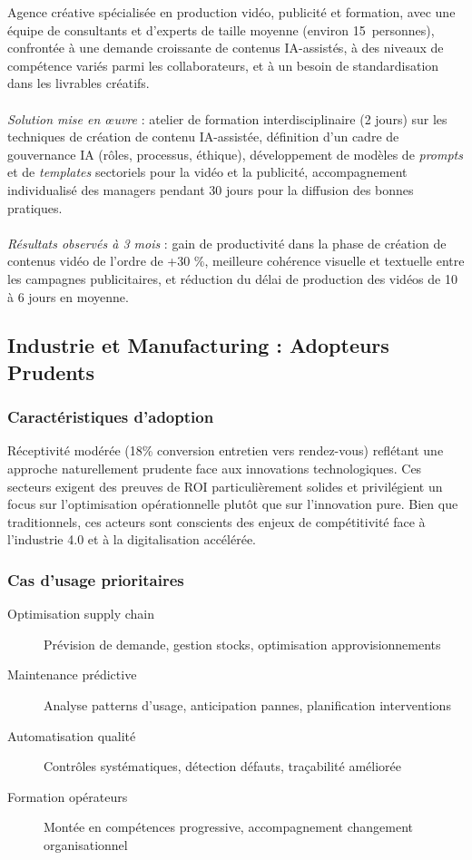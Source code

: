 Agence créative spécialisée en production vidéo, publicité et formation, avec une équipe de consultants et d'experts de taille moyenne (environ 15~personnes), confrontée à une demande croissante de contenus IA-assistés, à des niveaux de compétence variés parmi les collaborateurs, et à un besoin de standardisation dans les livrables créatifs.
\\\\
\emph{Solution mise en œuvre} : atelier de formation interdisciplinaire (2 jours) sur les techniques de création de contenu IA-assistée, définition d’un cadre de gouvernance IA (rôles, processus, éthique), développement de modèles de \emph{prompts} et de \emph{templates} sectoriels pour la vidéo et la publicité, accompagnement individualisé des managers pendant 30 jours pour la diffusion des bonnes pratiques.
\\\\
\emph{Résultats observés à 3 mois} : gain de productivité dans la phase de création de contenus vidéo de l’ordre de +30 \%, meilleure cohérence visuelle et textuelle entre les campagnes publicitaires, et réduction du délai de production des vidéos de 10 à 6 jours en moyenne.


\subsection{Industrie et Manufacturing : Adopteurs Prudents}

\subsubsection{Caractéristiques d'adoption}
Réceptivité modérée (18\% conversion entretien vers rendez-vous) reflétant une approche naturellement prudente face aux innovations technologiques. Ces secteurs exigent des preuves de ROI particulièrement solides et privilégient un focus sur l'optimisation opérationnelle plutôt que sur l'innovation pure. Bien que traditionnels, ces acteurs sont conscients des enjeux de compétitivité face à l'industrie 4.0 et à la digitalisation accélérée.

\subsubsection{Cas d'usage prioritaires}
\begin{description}
    \item[Optimisation supply chain] Prévision de demande, gestion stocks, optimisation approvisionnements
    \item[Maintenance prédictive] Analyse patterns d'usage, anticipation pannes, planification interventions  
    \item[Automatisation qualité] Contrôles systématiques, détection défauts, traçabilité améliorée
    \item[Formation opérateurs] Montée en compétences progressive, accompagnement changement organisationnel
\end{description}

